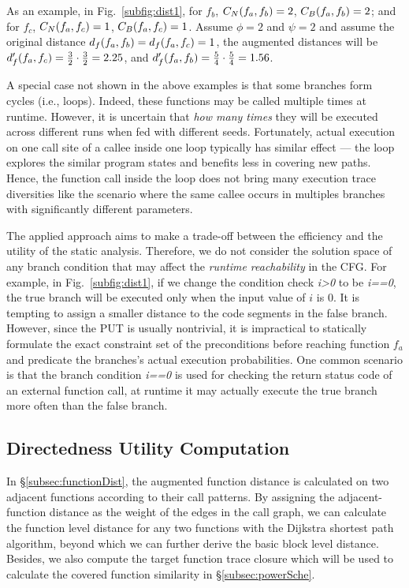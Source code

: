 As an example, in Fig.~\ref{subfig:dist1}, for $f_b$, $C_N(f_a, f_b)=2$, $C_B(f_a, f_b)=2$; and for $f_c$, $C_N(f_a, f_c)=1$, $C_B(f_a, f_c)=1$. Assume $\phi=2$ and $\psi=2$ and assume the original distance $d_f(f_a,f_b)=d_f(f_a,f_c)=1$, the augmented distances will be $d^{\prime}_f(f_a,f_c)=\frac{3}{2}\cdot\frac{3}{2}=2.25$, and $d^{\prime}_f(f_a,f_b)=\frac{5}{4}\cdot\frac{5}{4}=1.56$.


A special case not shown in the above examples is that some branches form cycles (i.e., loops). Indeed, these functions may be called multiple times at runtime. However, it is uncertain that \emph{how many times} they will be executed across different runs when fed with different seeds. Fortunately, actual execution on one call site of a callee inside one loop typically has similar effect --- the loop explores the similar program states and benefits less in covering new paths. Hence, the function call inside the loop does not bring many execution trace diversities like the scenario where the same callee occurs in multiples branches with significantly different parameters.

The applied approach aims to make a trade-off between the efficiency and the utility of the static analysis. Therefore, we do not consider the solution space of any branch condition that may affect the \emph{runtime reachability} in the CFG. For example, in Fig.~\ref{subfig:dist1}, if we change the condition check \emph{i>0} to be \emph{i==0}, the true branch will be executed only when the input value of $i$ is 0. It is tempting to assign a smaller distance to the code segments in the false branch. However, since the PUT is usually nontrivial, it is impractical to statically formulate the exact constraint set of the preconditions before reaching function $f_a$ and predicate the branches's actual execution probabilities. One common scenario is that the branch condition \emph{i==0} is used for checking the return status code of an external function call, at runtime it may actually execute the true branch more often than the false branch.




\subsection{Directedness Utility Computation} \label{subsec:UtilityComputation}

In \S\ref{subsec:functionDist}, the augmented function distance is calculated on two adjacent functions according to their call patterns. By assigning  the adjacent-function distance as the weight of the edges in the call graph, we can calculate the function level distance for any two functions with the Dijkstra shortest path algorithm, beyond which we can further derive the 
basic block level distance. 
Besides, we also compute the target function trace closure which will be used to calculate the covered function similarity in \S\ref{subsec:powerSche}.

